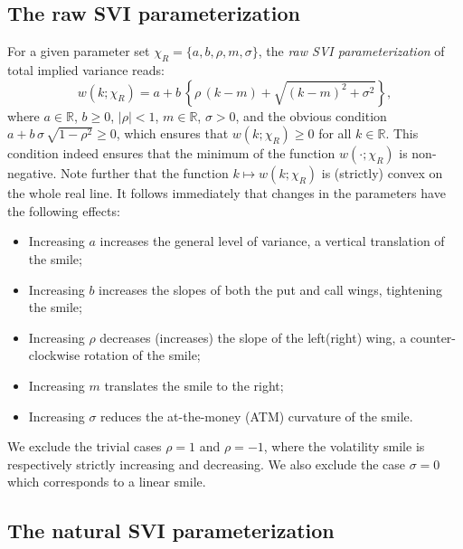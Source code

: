 \documentclass[12pt]{article}
\numberwithin{equation}{section}
\newcommand{\beq}{\begin{equation}}
\newcommand{\eeq}{\end{equation}}
\begin{document}
\subsection{The raw SVI parameterization}
For a given parameter set $\chi_R=\{a,b,\rho, m , \sigma\}$, the {\em raw SVI parameterization} of total implied variance reads:
\beq
w(k;\chi_R)=a+b\,\left\{\rho\,(k-m)+\sqrt{(k-m)^2+\sigma^2}\right\},
\label{eq:SVIraw}
\eeq
where $a\in\mathbb{R}$, $b\geq 0$, $|\rho|<1$, $m\in\mathbb{R}$, $\sigma>0$,
and the obvious condition $a+b\,\sigma\,\sqrt{1-\rho^2}\geq 0$, 
which ensures that $w(k;\chi_R)\geq 0$ for all $k\in\mathbb{R}$.
This condition indeed ensures that the minimum of the function $w(\cdot;\chi_R)$ is non-negative.
Note further that the function $k\mapsto w(k;\chi_R)$ is (strictly) convex on the whole real line.
It follows immediately that changes in the parameters have the following effects:
\begin{itemize}
\item Increasing $a$ increases the general level of variance, a vertical translation of the smile;
\item Increasing $b$ increases the slopes of both the put and call wings, tightening the smile;
\item Increasing $\rho$ decreases (increases) the slope of the left(right) wing, a counter-clockwise rotation of the smile;
\item Increasing $m$ translates the smile to the right;
\item Increasing $\sigma$ reduces the at-the-money (ATM) curvature of the smile.
\end{itemize}
{We exclude the trivial cases $\rho=1$ and $\rho=-1$, where the volatility smile is respectively strictly increasing and decreasing.
We also exclude the case $\sigma=0$ which corresponds to a linear smile.}


\subsection{The natural SVI parameterization}
\end{document}
